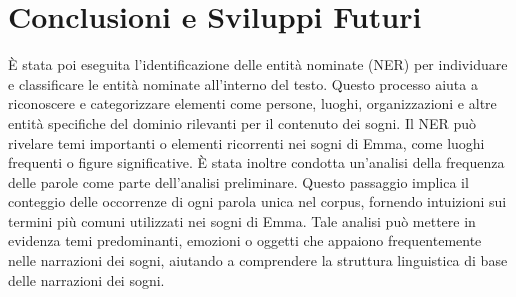 \chapter*{Conclusioni e Sviluppi Futuri}

È stata poi eseguita l'identificazione delle entità nominate (NER) per individuare e classificare le entità nominate
all'interno del testo. Questo processo aiuta a riconoscere e categorizzare elementi come persone, luoghi,
organizzazioni e altre entità specifiche del dominio rilevanti per il contenuto dei sogni. Il NER può rivelare
temi importanti o elementi ricorrenti nei sogni di Emma, come luoghi frequenti o figure significative.
È stata inoltre condotta un'analisi della frequenza delle parole come parte dell'analisi preliminare.
Questo passaggio implica il conteggio delle occorrenze di ogni parola unica nel corpus, fornendo intuizioni sui
termini più comuni utilizzati nei sogni di Emma. Tale analisi può mettere in evidenza temi predominanti, emozioni o
oggetti che appaiono frequentemente nelle narrazioni dei sogni, aiutando a comprendere la struttura linguistica
di base delle narrazioni dei sogni.